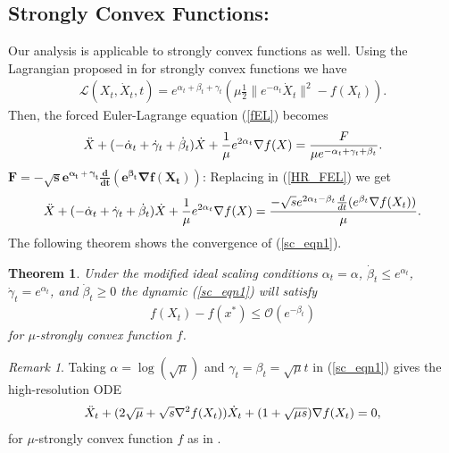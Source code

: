 \documentclass{article}
\theoremstyle{plain}
\newtheorem{theorem}{Theorem}[section]
\theoremstyle{definition}
\theoremstyle{remark}
\newtheorem{remark}{Remark}[theorem]
\begin{document}
\subsection{Strongly Convex Functions:} Our analysis is applicable to strongly convex functions as well. Using the Lagrangian proposed in \citep{wilson2021lyapunov} for strongly convex functions we have
\begin{align}\label{strongly_cvx_lagrange}
    \mathcal{L}(X_t,\dot X_t,t)=e^{\alpha_t+\beta_t+\gamma_t}(\mu \frac{1}{2}\|e^{-\alpha_t}\dot X_t\|^2-f(X_t)).
\end{align}
Then, the forced Euler-Lagrange equation (\ref{fEL}) becomes
\begin{align}\label{HR_FEL}
    \Ddot{X}+(-\dot \alpha_t + \dot 
 \gamma_t+ \dot \beta_t)\dot X+\frac{1}{\mu}e^{2\alpha_t}\nabla f(X)=\frac{F}{\mu e^{-\alpha_t + \gamma_t + \beta_t}}.
\end{align}
\(\boldsymbol{F=-\sqrt{s}e^{\alpha_t+\gamma_t}\frac{d}{dt}(e^{\beta_t}\nabla f(X_t))}\): Replacing in (\ref{HR_FEL}) we get
\begin{align}\label{sc_eqn1}
    \Ddot{X}+(-\dot \alpha_t + \dot 
 \gamma_t+ \dot \beta_t)\dot X+\frac{1}{\mu}e^{2\alpha_t}\nabla f(X)=\frac{-\sqrt{s}e^{2\alpha_t-\beta_t}\frac{d}{dt}(e^{\beta_t}\nabla f(X_t))}{\mu }.
\end{align}
The following theorem shows the convergence of (\ref{sc_eqn1}).
\begin{theorem}\label{Theorem3_1}
    Under the modified ideal scaling conditions \(\alpha_t=\alpha\), \(\dot \beta_t\leq e^{\alpha_t}\), \(\dot \gamma_t=e^{\alpha_t}\), and \(\dot \beta_t\geq 0\) the dynamic (\ref{sc_eqn1}) will satisfy
    \begin{align}\label{Theorem32_eqn1}
      f(X_t)-f(x^*)\leq \mathcal{O}(e^{-\beta_t})  
    \end{align}
    for \(\mu\)-strongly convex function \(f\).
\end{theorem}
\begin{remark}
    Taking \(\alpha=\log(\sqrt{\mu})\) and \(\gamma_t=\beta_t=\sqrt{\mu}t\) in (\ref{sc_eqn1}) gives the high-resolution ODE 
\begin{align}\label{high-res-ODE}
    \Ddot{X}_t+(2\sqrt{\mu}+\sqrt{s}\nabla^2 f(X_t))\dot X_t +(1+\sqrt{\mu s })\nabla f(X_t)=0,
\end{align}
for \(\mu\)-strongly convex function \(f\) as in \citep{Shi2021UnderstandingTA}.
\end{remark}
\end{document}
